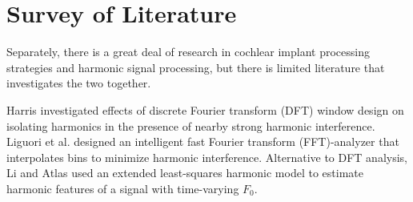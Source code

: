 \documentclass [11pt, proquest,oneside] {ganter_thesis}[2015/03/03]
\begin{document}










\section{Survey of Literature}

Separately, there is a great deal of research in cochlear implant processing strategies and harmonic signal processing, but there is limited literature that investigates the two together.

Harris \cite{harris1978use} investigated effects of discrete Fourier transform (DFT) window design on isolating harmonics in the presence of nearby strong harmonic interference.  Liguori et al. \cite{liguori2004intelligent} designed an intelligent fast Fourier transform (FFT)-analyzer that interpolates bins to minimize harmonic interference.  Alternative to DFT analysis, Li and Atlas \cite{li2003time} used an extended least-squares harmonic model to estimate harmonic features of a signal with time-varying $F_0$.
\end{document}
